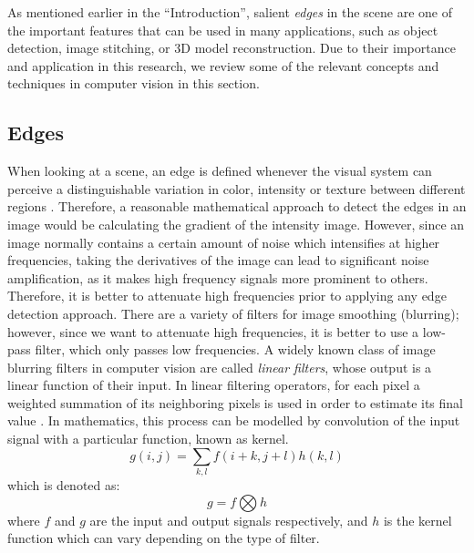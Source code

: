 As mentioned earlier in the ``Introduction'', salient {\it edges} in the scene are one of the important features 
that can be used in many applications, such as object detection, image stitching, or 3D model reconstruction.
Due to their importance and application in this research, we review some of the relevant concepts and techniques in computer vision in this section.

\subsection{Edges}
When looking at a scene, an edge is defined whenever the visual system can perceive a distinguishable variation in color, intensity or texture between 
different regions \cite{sze11}.
Therefore, a reasonable mathematical approach to detect the edges in an image would be calculating the gradient of the intensity image. However, since an image normally contains a certain amount of
noise which intensifies at higher frequencies, taking the derivatives of the image can lead to significant noise amplification, as it makes high frequency signals more prominent to others.
Therefore, it is better to attenuate high frequencies prior to applying any edge detection approach. 
There are a variety of filters for image smoothing (blurring); however, since we want to attenuate high frequencies, it is better to use a low-pass filter, which only passes low frequencies.
A widely known class of image blurring filters in computer vision are called {\it linear filters}, whose output is a linear function of their input. 
In linear filtering operators, for each pixel a weighted summation of its neighboring pixels
is used in order to estimate its final value \cite{sze11}. In mathematics, this process can be modelled by convolution of the input signal with a particular function, known as kernel. 
\begin{equation}
g(i,j)=\sum_{k,l}f(i+k,j+l)h(k,l)
\end{equation}
which is denoted as:
\begin{equation}
g=f\bigotimes h
\end{equation}
where $f$ and $g$ are the input and output signals respectively, and $h$ is the kernel function which can vary depending on the type of filter. 

